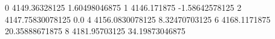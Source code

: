 0 4149.36328125 1.60498046875
1 4146.171875 -1.58642578125
2 4147.75830078125 0.0
4 4156.0830078125 8.32470703125
6 4168.1171875 20.35888671875
8 4181.95703125 34.19873046875
